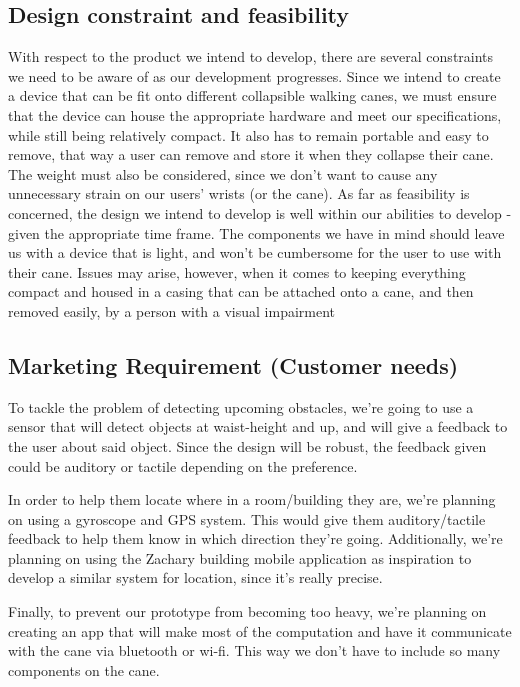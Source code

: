 \documentclass[letterpaper,12pt]{article}
\begin{document}
\subsection{Design constraint and feasibility}
 With respect to the product we intend to develop, there are several constraints we need to be aware of as our development progresses. Since we intend to create a device that can be fit onto different collapsible walking canes, we must ensure that the device can house the appropriate hardware and meet our specifications, while still being relatively compact. It also has to remain portable and easy to remove, that way a user can remove and store it  when they collapse their cane. The weight must also be considered, since we don’t want to cause any unnecessary strain on our users’ wrists (or the cane). As far as feasibility is concerned, the design we intend to develop is well within our abilities to develop - given the appropriate time frame. The components we have in mind should leave us with a device that is light, and won’t be cumbersome for the user to use with their cane. Issues may arise, however,  when it comes to keeping everything compact and housed in a casing that can be attached onto a cane, and then removed easily, by a person with a visual impairment \par

\subsection{Marketing Requirement (Customer needs)}
To tackle the problem of detecting upcoming obstacles, we're going to use a sensor that will detect objects at waist-height and up, and will give a feedback to the user about said object. Since the design will be robust, the feedback given could be auditory or tactile depending on the preference. \par
In order to help them locate where in a room/building they are, we're planning on using a gyroscope and GPS system. This would give them auditory/tactile feedback to help them know in which direction they're going. Additionally, we're planning on using the Zachary building mobile application as inspiration to develop a similar system for location, since it's really precise. \par
Finally, to prevent our prototype from becoming too heavy, we're planning on creating an app that will make most of the computation and have it communicate with the cane via bluetooth or wi-fi. This way we don't have to include so many components on the cane.
\end{document}
